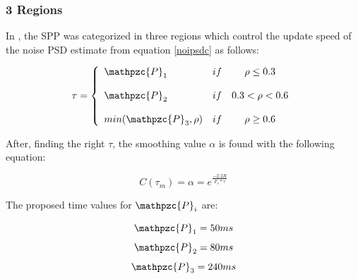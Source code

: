 \subsubsection{3 Regions}

In \cite{PeiCheeYongSvenNordholm2012NoiseSmoothong}, the SPP was categorized in three regions which control the update speed of the noise PSD  estimate from equation \ref{noipsdc} as follows:
 
\begin{equation}\label{Stag2}
\tau= \left\{ \begin{array}{lcc}
             \mathpzc{P}_1 &   if  & \rho \leq 0.3 \\
             \\ \mathpzc{P}_2 &  if & 0.3 < \rho < 0.6 \\
             \\ min(\mathpzc{P}_3,\rho) &  if  &\rho \geq 0.6
             \end{array}
   \right.
\end{equation}
 \medskip
 
 After, finding the right $\tau$, the smoothing value $\alpha$ is found with the following equation:
 
\begin{equation}
C(\tau_m)=\alpha =  e^{\frac{-2.2R}{F_{s}*\tau}}
\label{fromTime}
\end{equation}


The proposed time values for $\mathpzc{P}_i$ are:

$$\mathpzc{P}_1=50ms$$
$$\mathpzc{P}_2=80ms$$
$$\mathpzc{P}_3=240ms$$







